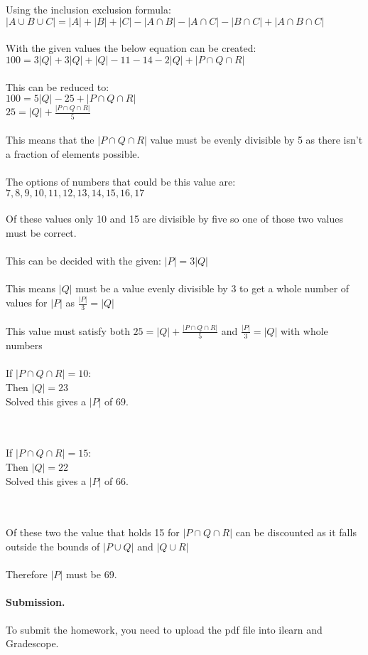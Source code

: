 \documentclass{article}
\begin{document}
\begin{solution}

\\\\ Using the inclusion exclusion formula:
\\ $|A \cup B \cup C| = |A| + |B| + |C| - |A \cap B| - |A \cap C| - |B \cap C| + |A \cap B \cap C|$
\\\\ With the given values the below equation can be created:
\\ $100 = 3|Q| + 3|Q| + |Q| - 11 - 14 - 2|Q| + |P \cap Q \cap R|$
\\\\ This can be reduced to:
\\ $100 = 5|Q| - 25 + |P \cap Q \cap R|$
\\ $25 = |Q| + \frac{|P \cap Q \cap R|}{5}$
\\\\ This means that the $|P \cap Q \cap R|$ value must be evenly divisible by 5 as there isn't a fraction of elements possible.
\\\\ The options of numbers that could be this value are:
\\ $7, 8, 9, 10, 11, 12, 13, 14, 15, 16, 17$
\\\\ Of these values only 10 and 15 are divisible by five so one of those two values must be correct.
\\\\ This can be decided with the given: $|P| = 3|Q|$
\\\\ This means $|Q|$ must be a value evenly divisible by 3 to get a whole number of values for $|P|$ as $\frac{|P|}{3} = |Q|$
\\\\ This value must satisfy both $25 = |Q| + \frac{|P \cap Q \cap R|}{5}$ and $\frac{|P|}{3} = |Q|$ with whole numbers
\\\\ If $|P \cap Q \cap R| = 10$:
\\ Then $|Q| = 23$
\\ Solved this gives a $|P|$ of 69.

\\\\ If $|P \cap Q \cap R| = 15$:
\\ Then $|Q| = 22$
\\ Solved this gives a $|P|$ of 66.
\newline

\\\\ Of these two the value that holds 15 for $|P \cap Q \cap R|$ can be discounted as it falls outside the bounds of $|P \cup Q|$ and $|Q \cup R|$
\\\\ Therefore $|P|$ must be 69.
\end{solution}


\vskip 0.1in
\paragraph{Submission.}
To submit the homework, you need to upload the pdf file into ilearn and Gradescope.
\end{document}
